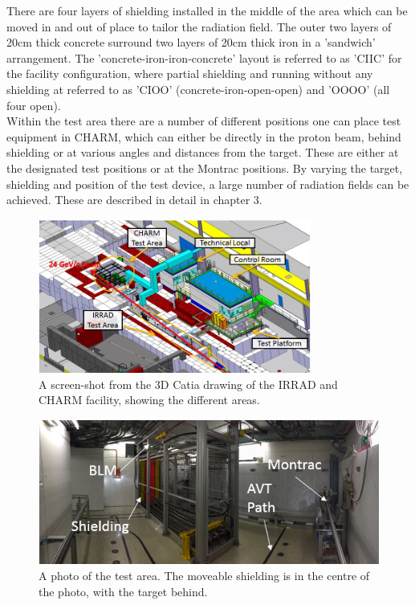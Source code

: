 There are four layers of shielding installed in the middle of the area which can be moved in and out of place to tailor the radiation field. The outer two layers of 20cm thick concrete surround two layers of 20cm thick iron in a 'sandwich' arrangement. The 'concrete-iron-iron-concrete' layout is referred to as 'CIIC' for the facility configuration, where partial shielding and running without any shielding at referred to as 'CIOO' (concrete-iron-open-open) and 'OOOO' (all four open). \\

Within the test area there are a number of different positions one can place test equipment in CHARM, which can either be directly in the proton beam, behind shielding or at various angles and distances from the target. These are either at the designated test positions or at the Montrac positions. By varying the target, shielding and position of the test device, a large number of radiation fields can be achieved. These are described in detail in chapter 3. \\

\begin{figure}[ht!]
	\centering
	\includegraphics[width=0.8\textwidth]{./images/charm_overall_ann}
	\caption{A screen-shot from the 3D Catia drawing of the IRRAD and CHARM facility, showing the different areas.}
	\label{fig:irrads_layout}
\end{figure}

\begin{figure}[!ht]
	\centering
	\includegraphics[width=\textwidth]{./images/test_area_photo_ann}
	\caption{A photo of the test area. The moveable shielding is in the centre of the photo, with the target behind.}
	\label{fig:test_area_photo}
\end{figure}

